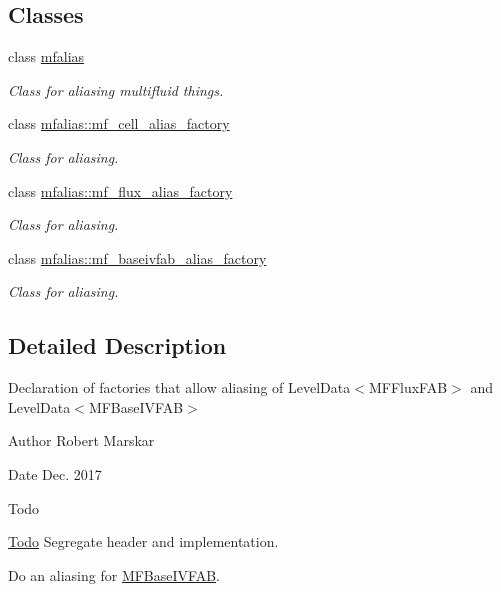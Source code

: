 \subsection*{Classes}
\begin{DoxyCompactItemize}
\item 
class \hyperlink{classmfalias}{mfalias}
\begin{DoxyCompactList}\small\item\em Class for aliasing multifluid things. \end{DoxyCompactList}\item 
class \hyperlink{classmfalias_1_1mf__cell__alias__factory}{mfalias\+::mf\+\_\+cell\+\_\+alias\+\_\+factory}
\begin{DoxyCompactList}\small\item\em Class for aliasing. \end{DoxyCompactList}\item 
class \hyperlink{classmfalias_1_1mf__flux__alias__factory}{mfalias\+::mf\+\_\+flux\+\_\+alias\+\_\+factory}
\begin{DoxyCompactList}\small\item\em Class for aliasing. \end{DoxyCompactList}\item 
class \hyperlink{classmfalias_1_1mf__baseivfab__alias__factory}{mfalias\+::mf\+\_\+baseivfab\+\_\+alias\+\_\+factory}
\begin{DoxyCompactList}\small\item\em Class for aliasing. \end{DoxyCompactList}\end{DoxyCompactItemize}


\subsection{Detailed Description}
Declaration of factories that allow aliasing of Level\+Data$<$\+M\+F\+Flux\+F\+A\+B$>$ and Level\+Data$<$\+M\+F\+Base\+I\+V\+F\+A\+B$>$ 

\begin{DoxyAuthor}{Author}
Robert Marskar 
\end{DoxyAuthor}
\begin{DoxyDate}{Date}
Dec. 2017 
\end{DoxyDate}
\begin{DoxyRefDesc}{Todo}
\item[\hyperlink{todo__todo000003}{Todo}]Segregate header and implementation. 

Do an aliasing for \hyperlink{classMFBaseIVFAB}{M\+F\+Base\+I\+V\+F\+AB}. \end{DoxyRefDesc}
